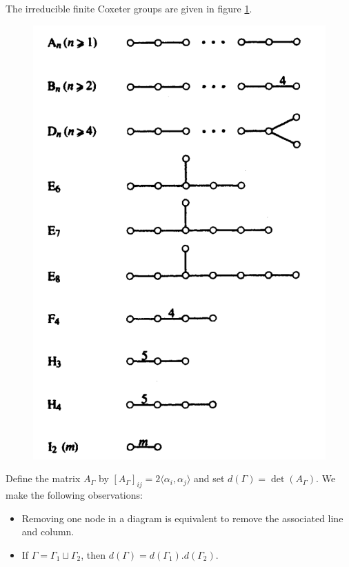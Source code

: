 \begin{theorem}
The irreducible finite Coxeter groups are given in figure \ref{Classification}.
\begin{figure}[h!]
\centering
\includegraphics[scale=0.6]{Classification.png}
\label{Classification}
\caption{}
\end{figure}
\label{classification thm}
\end{theorem}

\begin{remark}
Define the matrix $A_\Gamma$ by $[A_\Gamma]_{ij} = 2 \langle \alpha_i , \alpha_j \rangle$ and set $d(\Gamma) = \det (A_\Gamma ) $. We make the following observations:
\begin{itemize}
\item Removing one node in a diagram is equivalent to remove the associated line and column.
\item If $\Gamma = \Gamma_1 \sqcup \Gamma_2$, then $d(\Gamma ) = d (\Gamma_1). d(\Gamma_2)$.
\end{itemize}
\end{remark}

